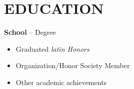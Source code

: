 \documentclass[11pt,letterpaper]{article}
\newcommand{\subheading}[3]{
    \textbf{#1}{#2 }{\hfill #3 \vspace{-2pt}}
}
\begin{document}
\section*{EDUCATION}
\subheading{School}{ -- Degree}{ %
} \\
\vspace{-8pt}
\begin{itemize}
  \item Graduated \textit{latin Honors} %
  \item Organization/Honor Society Member
  \item Other academic achievements
\end{itemize}
\vspace{-10pt}
\end{document}
